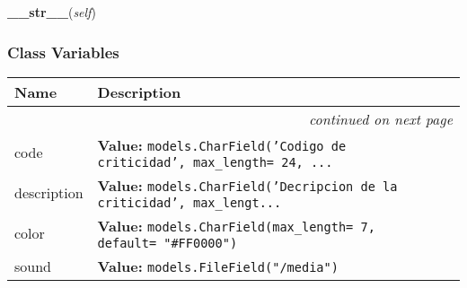     \label{GroundSegment:models:Alarms:Criticity:Criticity:__str__}

    \vspace{0.5ex}

\hspace{.8\funcindent}\begin{boxedminipage}{\funcwidth}

    \raggedright \textbf{\_\_str\_\_}(\textit{self})

\setlength{\parskip}{2ex}
\setlength{\parskip}{1ex}
    \end{boxedminipage}



  \subsubsection{Class Variables}

    \vspace{-1cm}
\hspace{\varindent}\begin{longtable}{|p{\varnamewidth}|p{\vardescrwidth}|l}
\cline{1-2}
\cline{1-2} \centering \textbf{Name} & \centering \textbf{Description}& \\
\cline{1-2}
\endhead\cline{1-2}\multicolumn{3}{r}{\small\textit{continued on next page}}\\\endfoot\cline{1-2}
\endlastfoot\raggedright c\-o\-d\-e\- & \raggedright \textbf{Value:} 
{\tt models.CharField('Codigo de criticidad', max\_length= 24, \texttt{...}}&\\
\cline{1-2}
\raggedright d\-e\-s\-c\-r\-i\-p\-t\-i\-o\-n\- & \raggedright \textbf{Value:} 
{\tt models.CharField('Decripcion de la criticidad', max\_lengt\texttt{...}}&\\
\cline{1-2}
\raggedright c\-o\-l\-o\-r\- & \raggedright \textbf{Value:} 
{\tt models.CharField(max\_length= 7, default= "\#FF0000")}&\\
\cline{1-2}
\raggedright s\-o\-u\-n\-d\- & \raggedright \textbf{Value:} 
{\tt models.FileField("/media")}&\\
\cline{1-2}
\end{longtable}

